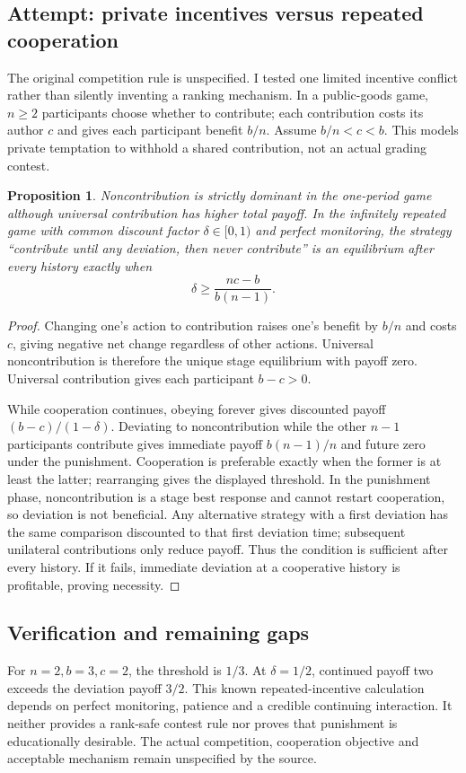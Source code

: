 \documentclass[11pt]{article}
\newtheorem{proposition}{Proposition}
\begin{document}
\subsection{Attempt: private incentives versus repeated cooperation}
The original competition rule is unspecified. I tested one limited incentive conflict rather than silently inventing a ranking mechanism. In a public-goods game, $n\ge2$ participants choose whether to contribute; each contribution costs its author $c$ and gives each participant benefit $b/n$. Assume $b/n<c<b$. This models private temptation to withhold a shared contribution, not an actual grading contest.
\begin{proposition}
Noncontribution is strictly dominant in the one-period game although universal contribution has higher total payoff. In the infinitely repeated game with common discount factor $\delta\in[0,1)$ and perfect monitoring, the strategy ``contribute until any deviation, then never contribute'' is an equilibrium after every history exactly when
\[
\delta\ge\frac{nc-b}{b(n-1)}.
\]
\end{proposition}
\begin{proof}
Changing one's action to contribution raises one's benefit by $b/n$ and costs $c$, giving negative net change regardless of other actions. Universal noncontribution is therefore the unique stage equilibrium with payoff zero. Universal contribution gives each participant $b-c>0$.

While cooperation continues, obeying forever gives discounted payoff $(b-c)/(1-\delta)$. Deviating to noncontribution while the other $n-1$ participants contribute gives immediate payoff $b(n-1)/n$ and future zero under the punishment. Cooperation is preferable exactly when the former is at least the latter; rearranging gives the displayed threshold. In the punishment phase, noncontribution is a stage best response and cannot restart cooperation, so deviation is not beneficial. Any alternative strategy with a first deviation has the same comparison discounted to that first deviation time; subsequent unilateral contributions only reduce payoff. Thus the condition is sufficient after every history. If it fails, immediate deviation at a cooperative history is profitable, proving necessity.
\end{proof}
\subsection{Verification and remaining gaps}
For $n=2,b=3,c=2$, the threshold is $1/3$. At $\delta=1/2$, continued payoff two exceeds the deviation payoff $3/2$. This known repeated-incentive calculation depends on perfect monitoring, patience and a credible continuing interaction. It neither provides a rank-safe contest rule nor proves that punishment is educationally desirable. The actual competition, cooperation objective and acceptable mechanism remain unspecified by the source.
\end{document}
